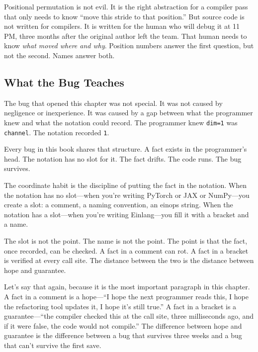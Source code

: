 \documentclass[11pt,titlepage]{article}
\begin{document}
\vspace{2em}

Positional permutation is not evil. It is the right abstraction for a
compiler pass that only needs to know ``move this stride to that
position.'' But source code is not written for compilers. It is written
for the human who will debug it at 11 PM, three months after the
original author left the team. That human needs to know \emph{what moved
where and why}. Position numbers answer the first question, but not the
second. Names answer both.

\vspace{2em}

\hypertarget{what-the-bug-teaches}{%
\subsection{What the Bug Teaches}\label{what-the-bug-teaches}}

The bug that opened this chapter was not special. It was not caused by
negligence or inexperience. It was caused by a gap between what the
programmer knew and what the notation could record. The programmer knew
\texttt{dim=1} was \texttt{channel}. The notation recorded \texttt{1}.

Every bug in this book shares that structure. A fact exists in the
programmer's head. The notation has no slot for it. The fact drifts. The
code runs. The bug survives.

The coordinate habit is the discipline of putting the fact in the
notation. When the notation has no slot---when you're writing PyTorch or
JAX or NumPy---you create a slot: a comment, a naming convention, an
einops string. When the notation has a slot---when you're writing
Einlang---you fill it with a bracket and a name.

The slot is not the point. The name is not the point. The point is that
the fact, once recorded, can be checked. A fact in a comment can rot. A
fact in a bracket is verified at every call site. The distance between
the two is the distance between hope and guarantee.

Let's say that again, because it is the most important paragraph in this
chapter. A fact in a comment is a hope---``I hope the next programmer
reads this, I hope the refactoring tool updates it, I hope it's still
true.'' A fact in a bracket is a guarantee---``the compiler checked this
at the call site, three milliseconds ago, and if it were false, the code
would not compile.'' The difference between hope and guarantee is the
difference between a bug that survives three weeks and a bug that can't
survive the first save.
\end{document}
